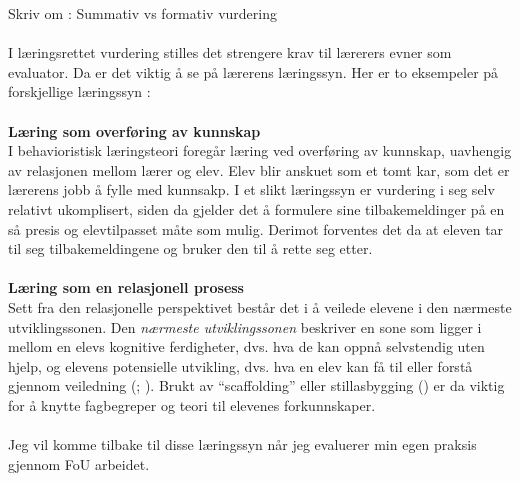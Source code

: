 \documentclass[main.tex]{subfiles}
\begin{document}
Skriv om : Summativ vs formativ vurdering
\\
\\
I læringsrettet vurdering stilles det strengere krav til lærerers evner som evaluator. Da er det viktig å se på lærerens læringssyn. Her er to eksempeler på forskjellige læringssyn :
\\
\\
\textbf{Læring som overføring av kunnskap}
\\
I behavioristisk læringsteori foregår læring ved overføring av kunnskap, uavhengig av relasjonen mellom lærer og elev. Elev blir anskuet som et tomt kar, som det er lærerens jobb å fylle
med kunnsakp. I et slikt læringssyn er vurdering i seg selv relativt ukomplisert, siden da gjelder det å formulere sine tilbakemeldinger på en så presis og elevtilpasset måte som mulig.
Derimot forventes det da at eleven tar til seg tilbakemeldingene og bruker den til å rette seg etter.
\\
\\
\textbf{Læring som en relasjonell prosess}
\\
Sett fra den relasjonelle perspektivet består det i å veilede elevene i den nærmeste utviklingssonen.
Den \emph{nærmeste utviklingssonen} beskriver en sone som ligger i mellom en elevs kognitive 
ferdigheter, dvs. hva de kan oppnå selvstendig uten hjelp, og elevens potensielle utvikling, dvs. 
hva en elev kan få til eller forstå gjennom veiledning (; ). 
Brukt av ``scaffolding'' eller stillasbygging () er da viktig for å knytte fagbegreper og teori til elevenes 
forkunnskaper.
\\
\\
Jeg vil komme tilbake til disse læringssyn når jeg evaluerer min egen praksis gjennom FoU arbeidet.
\end{document}
